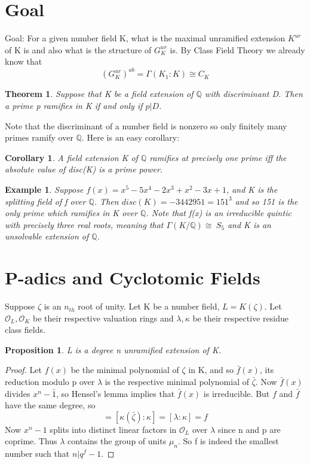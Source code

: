 \documentclass[preprint,12pt,reqno]{elsarticle}
\newtheorem{theorem}{Theorem}
\newtheorem{corollary}{Corollary}[theorem]
\newtheorem{proposition}{Proposition}
\newtheorem{example}{Example}
\begin{document}
\section{Goal}
Goal: For a given number field K, what is the maximal unramified extension $K^{ur}$ of K is and also what is the structure of $G_K^{ur}$ is. By Class Field Theory we already know that 
\begin{equation}
  (G_K^{ur})^{ab} = \Gamma(K_1:K)\cong C_K
\end{equation}
\begin{theorem}
 Suppose that K be a field extension of $\mathbb{Q}$ with discriminant D. Then a prime p
ramifies in K if and only if $p|D$.   
\end{theorem}
Note that the discriminant of a number field is nonzero so only finitely many primes ramify over $\mathbb{Q}$. Here is an easy corollary:
\begin{corollary}
A field extension K of $\mathbb{Q}$ ramifies at precisely one prime iff the absolute value of disc(K) is a prime power.
\end{corollary}
\begin{example}
    Suppose $f(x)=x^5-5x^4-2x^3+x^2-3x+1$, and K is the splitting field of f over $\mathbb{Q}$. Then $disc(K)=-3442951=151^3$ and so 151 is the only prime which ramifies in K over $\mathbb{Q}$. Note that f(x) is an irreducible quintic with precisely three real roots, meaning that $\Gamma(K/\mathbb{Q})\cong\ S_5$ and K is an unsolvable extension of $\mathbb{Q}$.
\end{example}
\section{P-adics and Cyclotomic Fields}
Suppose $\zeta$ is an $n_{th}$ root of unity. Let K be a number field, $L=K(\zeta)$. Let $\mathcal{O}_L,\mathcal{O}_K$ be their respective valuation rings and $\lambda,\kappa$ be their respective residue class fields. \begin{proposition}
L is a degree n unramified extension of K.
\end{proposition}
\begin{proof}
Let $f(x)$ be the minimal polynomial of $\zeta$ in K, and so $\bar{f}(x)$, its reduction modulo p over $\lambda$ is the respective minimal polynomial of $\bar{\zeta}$. Now $\bar{f}(x)$ divides $x^n-\bar{1}$, so Hensel's lemma implies that $\bar{f}(x)$ is irreducible. But $f$ and $\bar{f}$ have the same degree, so \begin{equation}
    [L:K]=[\kappa(\bar{\zeta}):\kappa]=[\lambda:\kappa]=f
\end{equation}
Now $x^n-1$ splits into distinct linear factors in $\mathcal{O}_L$ over $\lambda$ since n and p are coprime. Thus $\lambda$ contains the group of units $\mu_n$. So f is indeed the smallest number such that $n|q^f-1$. 
\end{proof}
\end{document}

